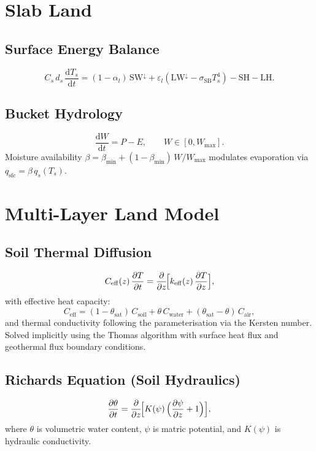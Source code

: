 \documentclass[11pt,twoside]{report}
\newcommand{\dd}{\mathrm{d}}
\newcommand{\pp}{\partial}
\newcommand{\SB}{\sigma_{\mathrm{SB}}}
\begin{document}
\section{Slab Land}

\subsection{Surface Energy Balance}
\begin{equation}
  C_s\,d_s\,\frac{\dd T_s}{\dd t}
  = (1-\alpha_l)\,\mathrm{SW}^\downarrow
  + \varepsilon_l(\mathrm{LW}^\downarrow-\SB T_s^4)
  - \mathrm{SH} - \mathrm{LH}.
\end{equation}

\subsection{Bucket Hydrology}
\begin{equation}
  \frac{\dd W}{\dd t} = P - E, \qquad W\in[0,W_{\max}].
\end{equation}
Moisture availability
$\beta=\beta_{\min}+(1-\beta_{\min})\,W/W_{\max}$ modulates evaporation
via $q_{\mathrm{sfc}}=\beta\,q_s(T_s)$.


\section{Multi-Layer Land Model}

\subsection{Soil Thermal Diffusion}
\begin{equation}
  C_{\mathrm{eff}}(z)\,\frac{\pp T}{\pp t}
  = \frac{\pp}{\pp z}\!\Bigl[k_{\mathrm{eff}}(z)\,\frac{\pp T}{\pp z}\Bigr],
\end{equation}
with effective heat capacity:
\begin{equation}
  C_{\mathrm{eff}} = (1-\theta_{\mathrm{sat}})\,C_{\mathrm{soil}}
  + \theta\,C_{\mathrm{water}}
  + (\theta_{\mathrm{sat}}-\theta)\,C_{\mathrm{air}},
\end{equation}
and thermal conductivity following the \citet{Johansen1975} parameterisation
via the Kersten number.  Solved implicitly using the Thomas algorithm with
surface heat flux and geothermal flux boundary conditions.

\subsection{Richards Equation (Soil Hydraulics)}
\begin{equation}
  \frac{\pp\theta}{\pp t} = \frac{\pp}{\pp z}
  \!\Bigl[K(\psi)\,\Bigl(\frac{\pp\psi}{\pp z}+1\Bigr)\Bigr],
\end{equation}
where $\theta$ is volumetric water content, $\psi$ is matric potential,
and $K(\psi)$ is hydraulic conductivity.
\end{document}
